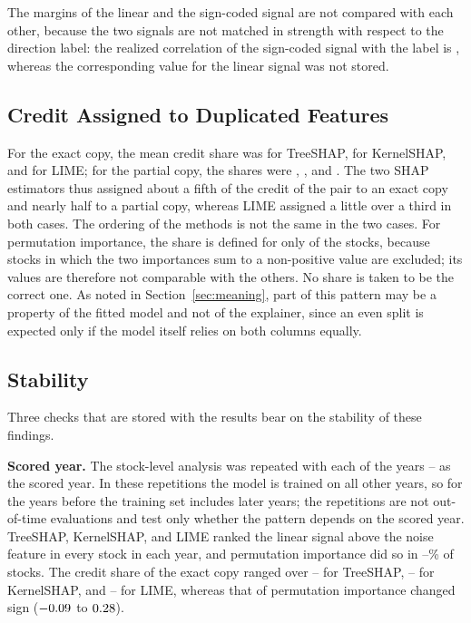 \documentclass[conference]{IEEEtran}
\begin{document}
The margins of the linear and the sign-coded signal are not compared with
each other, because the two signals are not matched in strength with respect
to the direction label: the realized correlation of the sign-coded signal
with the label is \gtNlCorrDir, whereas the corresponding value for the
linear signal was not stored.

\subsection{Credit Assigned to Duplicated Features}
For the exact copy, the mean credit share was \creditExactTreeshap{} for
TreeSHAP, \creditExactKernelshap{} for KernelSHAP, and \creditExactLime{}
for LIME; for the partial copy, the shares were \creditPartialTreeshap,
\creditPartialKernelshap, and \creditPartialLime. The two SHAP estimators
thus assigned about a fifth of the credit of the pair to an exact copy and
nearly half to a partial copy, whereas LIME assigned a little over a third
in both cases. The ordering of the methods is not the same in the two cases.
For permutation importance, the share is defined for only
\nCreditPermutation{} of the \faithUniverseN{} stocks, because stocks in
which the two importances sum to a non-positive value are excluded; its
values are therefore not comparable with the others. No share is taken to be
the correct one. As noted in Section~\ref{sec:meaning}, part of this pattern
may be a property of the fitted model and not of the explainer, since an
even split is expected only if the model itself relies on both columns
equally.

\subsection{Stability}
\label{sec:stability}
Three checks that are stored with the results bear on the stability of these
findings.

\textbf{Scored year.} The stock-level analysis was repeated with each of the
years \yearRobustFirst--\yearRobustLast{} as the scored year. In these
repetitions the model is trained on all other years, so for the years before
\scoreYear{} the training set includes later years; the repetitions are not
out-of-time evaluations and test only whether the pattern depends on the
scored year. TreeSHAP, KernelSHAP, and LIME ranked the linear signal above
the noise feature in every stock in each year, and permutation importance
did so in \yearPctSymMinPermutation--\yearPctSymMaxPermutation\% of stocks.
The credit share of the exact copy ranged over
\yearCopyCreditMinTreeshap--\yearCopyCreditMaxTreeshap{} for TreeSHAP,
\yearCopyCreditMinKernelshap--\yearCopyCreditMaxKernelshap{} for KernelSHAP,
and \yearCopyCreditMinLime--\yearCopyCreditMaxLime{} for LIME, whereas that
of permutation importance changed sign ($-0.09$ to
$0.28$).
\end{document}
